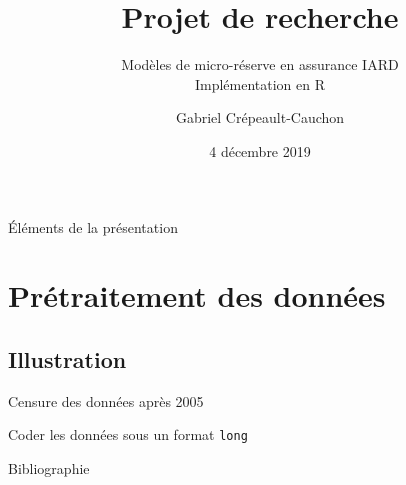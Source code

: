 \documentclass[aspectratio=169, 12pt, french]{beamer}
\title[\hyperlink{start}{ACT 2105}]{\Huge Projet de recherche}
\subtitle{Modèles de micro-réserve en assurance IARD  \\ Implémentation en R}
\author{Gabriel Crépeault-Cauchon}
\institute{Sous la direction de \\ Marie-Pier Côté, professeure adjointe \\ Université Laval}
\date{4 décembre 2019}
\begin{document}

\begin{frame}
\titlepage
\end{frame}

\begin{frame}{Éléments de la présentation}
\tableofcontents
\end{frame}

\section{Prétraitement des données}









\subsection{Illustration}
\begin{frame}
\noindent
\begin{minipage}{.6\linewidth}
\scalebox{0.6}{}
\end{minipage}
\hfill
\begin{minipage}{.3\linewidth}
\begin{itemize}
 {\item Censure des données après 2005}
 {\item Coder les données sous un format \texttt{long}}
\end{itemize}
\end{minipage}

\end{frame}









\begin{frame}{Bibliographie}

\end{frame}

\end{document}
